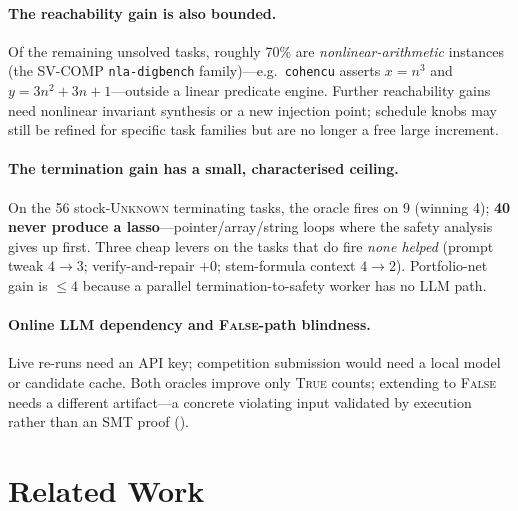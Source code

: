 \documentclass[runningheads]{llncs}
\begin{document}
\paragraph{The reachability gain is also bounded.} Of the remaining unsolved tasks, roughly 70\%
are \emph{nonlinear-arithmetic} instances (the SV-COMP \texttt{nla-digbench} family)---e.g.\
\texttt{cohencu} asserts $x=n^3$ and $y=3n^2{+}3n{+}1$---outside a linear predicate engine.
Further reachability gains need nonlinear invariant synthesis or a new injection point; schedule
knobs may still be refined for specific task families but are no longer a free large increment.

\paragraph{The termination gain has a small, characterised ceiling.} On the 56 stock-\textsc{Unknown}
terminating tasks, the oracle fires on 9 (winning 4); \textbf{40 never produce a lasso}---pointer/array/string
loops where the safety analysis gives up first. Three cheap levers on the tasks that do fire
\emph{none helped} (prompt tweak $4{\to}3$; verify-and-repair $+0$; stem-formula context $4{\to}2$).
Portfolio-net gain is $\le 4$ because a parallel termination-to-safety worker has no LLM path.

\paragraph{Online LLM dependency and \textsc{False}-path blindness.} Live re-runs need an API
key; competition submission would need a local model or candidate cache. Both oracles improve only
\textsc{True} counts; extending to \textsc{False} needs a different artifact---a concrete violating
input validated by execution rather than an SMT proof (\Cref{sec:future}).

\section{Related Work}
\label{sec:related}
\end{document}
